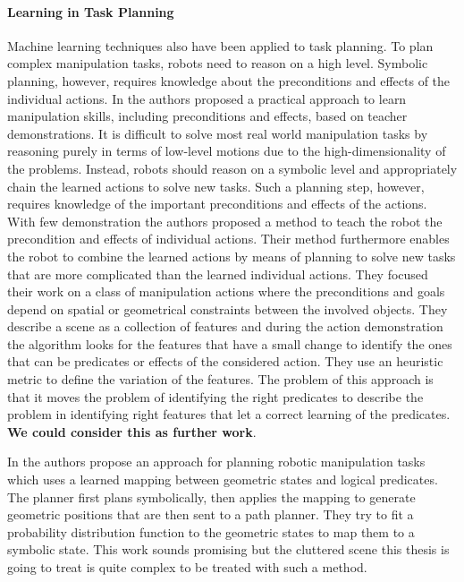 \paragraph{Learning in Task Planning}
Machine learning techniques also have been applied to task planning. To plan complex manipulation tasks,
robots need to reason on a high level. Symbolic planning, however, requires knowledge about the preconditions and effects
of the individual actions. 
In \citep{abdo2013learning} the authors proposed a practical
approach to learn manipulation skills, including preconditions
and effects, based on teacher demonstrations.
It is difficult to solve most real world manipulation tasks by reasoning purely in terms of low-level motions due to the high-dimensionality of the problems. Instead, robots should reason on a symbolic level and appropriately chain the learned actions to solve new tasks.  Such a planning step, however, requires knowledge of the important preconditions and effects of the actions.
With few demonstration the authors proposed a method to teach the robot the precondition and effects of individual actions. Their method furthermore enables the robot to combine the learned actions by means of planning to solve new tasks that are more complicated than the learned individual actions. 
They focused their work on a class of manipulation actions where the preconditions and goals depend on spatial or geometrical constraints between the involved objects. They describe a scene as a collection of features and during the action demonstration the algorithm looks for the features that have a small change to identify the ones that can be predicates or effects of the considered action. They use an heuristic metric to define the variation of the features.
The problem of this approach is that it moves the problem of identifying the right predicates to describe the problem in identifying right features that let a correct learning of the predicates. \textbf{We could consider this as further work}. 

In \citep{Dearden2014355} \citep{dearden2013approach}	 the authors propose an approach for planning robotic manipulation tasks which uses a learned mapping between geometric states and logical predicates. The planner first plans symbolically, then applies the mapping to generate geometric positions that are then sent to a path planner. They try to fit a probability distribution function to the geometric states to map them to a symbolic state. This work sounds promising but the cluttered scene this thesis is going to treat is quite complex to be treated with such a method. 


